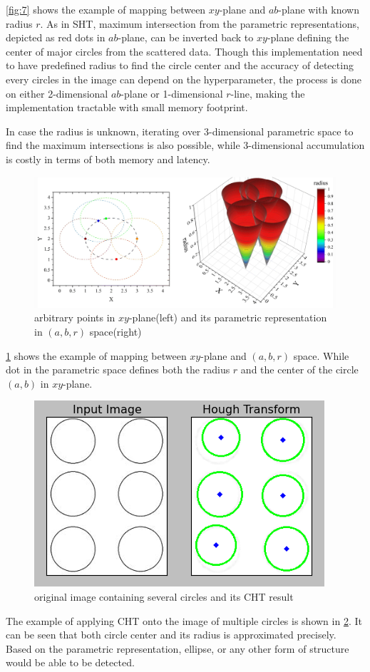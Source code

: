 \documentclass[extendedabs]{bmvc2k}
\begin{document}
\figurename{\ref{fig:7}} shows the example of mapping between $xy$-plane and $ab$-plane with known radius $r$.
As in SHT, maximum intersection from the parametric representations, depicted as red dots in $ab$-plane,
can be inverted back to $xy$-plane defining the center of major circles from the scattered data.
Though this implementation need to have predefined radius to find the circle center and the accuracy of
detecting every circles in the image can depend on the hyperparameter, the process is done on either 2-dimensional
$ab$-plane or 1-dimensional $r$-line, making the implementation tractable with small memory footprint. 

In case the radius is unknown, iterating over 3-dimensional parametric space to find the maximum intersections
is also possible, while 3-dimensional accumulation is costly in terms of both memory and latency. 

\begin{figure}[h]
    \centering
    \includegraphics[width=\linewidth]{hw4_4_3}
    \caption{arbitrary points in $xy$-plane(left) and its parametric representation in $(a, b, r)$ space(right)}
    \label{fig:8}
\end{figure}

\figurename{\ref{fig:8}} shows the example of mapping between $xy$-plane and $(a, b, r)$ space. While dot in the
parametric space defines both the radius $r$ and the center of the circle $(a, b)$ in $xy$-plane.

\begin{figure}[h]
    \centering
    \includegraphics[width=\linewidth]{hw4_4_4}
    \caption{original image containing several circles and its CHT result}
    \label{fig:9}
\end{figure}

The example of applying CHT onto the image of multiple circles is shown in \figurename{\ref{fig:9}}. It can be 
seen that both circle center and its radius is approximated precisely.
Based on the parametric representation, ellipse, or any other form of structure would be able to be detected.
\end{document}
